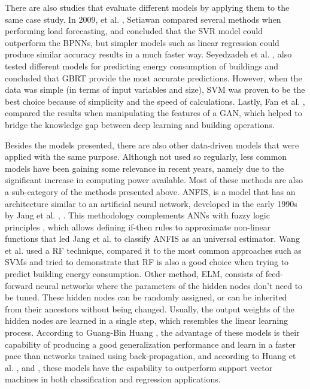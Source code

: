 There are also studies that evaluate different models by applying them to the same case study. In 2009, et al. \cite{svmr0}, Setiawan compared several methods when performing load forecasting, and concluded that the \ac{SVR} model could outperform the \ac{BPNN}s, but simpler models such as linear regression could produce similar accuracy results in a much faster way. Seyedzadeh et al. \cite{other2}, also tested different models for predicting energy consumption of buildings and concluded that \ac{GBRT} provide the most accurate predictions. However, when the data was simple (in terms of input variables and size), \ac{SVM} was proven to be the best choice because of simplicity and the speed of calculations. Lastly, Fan et al. \cite{other1}, compared the results when manipulating the features of a \ac{GAN}, which helped to bridge the knowledge gap between deep learning and building operations. 

Besides the models presented, there are also other data-driven models that were applied with the same purpose. Although not used so regularly, less common models have been gaining some relevance in recent years, namely due to the significant increase in computing power available. Most of these methods are also a sub-category of the methods presented above. \ac{ANFIS}, is a model that has an architecture similar to an artificial neural network, developed in the early 1990s by Jang et al. \cite{anfis1}, \cite{anfis2}. This methodology complements \ac{ANN}s with fuzzy logic principles \cite{anfis3}, which allows defining if-then rules to approximate non-linear functions that led Jang et al. \cite{anfis4} to classify \ac{ANFIS} as an universal estimator. Wang et al. \cite{rf0} used a \ac{RF} technique, compared it to the most common approaches such as \ac{SVM}s and tried to demonstrate that RF is also a good choice when trying to predict building energy consumption. Other method, \ac{ELM}, consists of feed-forward neural networks where the parameters of the hidden nodes don't need to be tuned. These hidden nodes can be randomly assigned, or can be inherited from their ancestors without being changed. Usually, the output weights of the hidden nodes are learned in a single step, which resembles the linear learning process. According to Guang-Bin Huang \cite{elm1}, the advantage of these models is their capability of producing a good generalization performance and learn in a faster pace than networks trained using back-propagation, and according to Huang et al. \cite{elm2}, \cite{elm3} and \cite{elm4}, these models have the capability to outperform support vector machines in both classification and regression applications.

